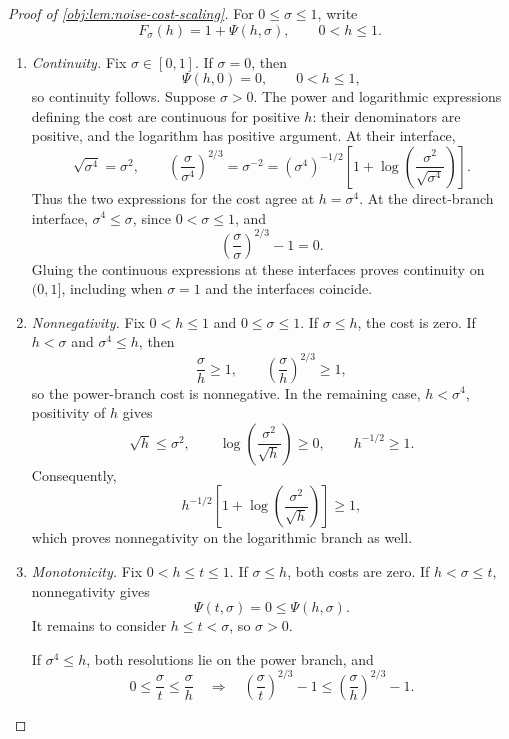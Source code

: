 \documentclass[11pt]{article}
\begin{document}
\begin{proof}[Proof of \cref{obj:lem:noise-cost-scaling}]
For \(0\le \sigma\le1\), write
\[
F_\sigma(h)=1+\Psi(h,\sigma),\qquad 0<h\le1.
\]
\begin{enumerate}
\item \emph{Continuity.}
Fix \(\sigma\in[0,1]\). If \(\sigma=0\), then
\[
\Psi(h,0)=0,\qquad 0<h\le1,
\]
so continuity follows. Suppose \(\sigma>0\). The power and logarithmic expressions defining the cost are continuous for positive \(h\): their denominators are positive, and the logarithm has positive argument. At their interface,
\[
\sqrt{\sigma^4}=\sigma^2,\qquad
\left(\frac{\sigma}{\sigma^4}\right)^{2/3}
=\sigma^{-2}
=(\sigma^4)^{-1/2}
 \left[1+\log\left(\frac{\sigma^2}{\sqrt{\sigma^4}}\right)\right].
\]
Thus the two expressions for the cost agree at \(h=\sigma^4\).
At the direct-branch interface, \(\sigma^4\le\sigma\), since \(0<\sigma\le1\), and
\[
\left(\frac{\sigma}{\sigma}\right)^{2/3}-1=0.
\]
Gluing the continuous expressions at these interfaces proves continuity on \((0,1]\), including when \(\sigma=1\) and the interfaces coincide.

\item \emph{Nonnegativity.}
Fix \(0<h\le1\) and \(0\le\sigma\le1\). If \(\sigma\le h\), the cost is zero. If \(h<\sigma\) and \(\sigma^4\le h\), then
\[
\frac{\sigma}{h}\ge1,\qquad
\left(\frac{\sigma}{h}\right)^{2/3}\ge1,
\]
so the power-branch cost is nonnegative. In the remaining case, \(h<\sigma^4\), positivity of \(h\) gives
\[
\sqrt h\le\sigma^2,\qquad
\log\left(\frac{\sigma^2}{\sqrt h}\right)\ge0,
\qquad h^{-1/2}\ge1.
\]
Consequently,
\[
h^{-1/2}\left[1+\log\left(\frac{\sigma^2}{\sqrt h}\right)\right]\ge1,
\]
which proves nonnegativity on the logarithmic branch as well.

\item \emph{Monotonicity.}
Fix \(0<h\le t\le1\). If \(\sigma\le h\), both costs are zero. If \(h<\sigma\le t\), nonnegativity gives
\[
\Psi(t,\sigma)=0\le\Psi(h,\sigma).
\]
It remains to consider \(h\le t<\sigma\), so \(\sigma>0\).

If \(\sigma^4\le h\), both resolutions lie on the power branch, and
\[
0\le\frac{\sigma}{t}\le\frac{\sigma}{h}
\quad\Longrightarrow\quad
\left(\frac{\sigma}{t}\right)^{2/3}-1
\le
\left(\frac{\sigma}{h}\right)^{2/3}-1.
\]


\end{enumerate}
\end{proof}
\end{document}
